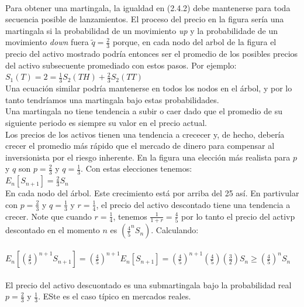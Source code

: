\documentclass{article}
\begin{document}
        \\
        Para obtener una martingala, la igualdad en (2.4.2) debe mantenerse para toda secuencia posible de lanzamientos.
        El proceso del precio en la figura sería una martingala si la probabilidad de un movimiento \textit{up} y la probabilidade
        de un movimiento \textit{down} fuera $\tilde{q} = \frac{2}{3}$ porque, en cada nodo del arbol de la figura el precio del
        activo mostrado podría entonces ser el promedio de los posibles precios
        del activo subsecuente promediado con estos pasos. Por ejemplo:
        \\
        $S_1(T) = 2 = \frac{1}{3} S_2(TH) + \frac{2}{3} S_2(TT)$
        \\
        Una ecuación similar podría mantenerse en todos los nodos en el árbol, y por lo tanto tendríamos una martingala bajo estas probabilidades.
        \\
        Una martingala no tiene tendencia a subir o caer dado que el promedio  de su
        siguiente periodo es siempre su valor en el precio actual.
        \\
        Los precios de los activos tienen una tendencia a crececer y, de hecho, debería crecer el promedio más rápido que
        el mercado de dinero para compensar al inversionista por el riesgo inherente. En la figura una elección más realista
        para $p$ y $q$ son $p = \frac{2}{3}$ y $q = \frac{1}{3}$.
        Con estas elecciones tenemos:
        \\
        $E_n[S_{n+1}] = \frac{2}{3} S_n$
        \\
        En cada nodo del árbol. Este crecimiento está por arriba del 25%
        así. En partivular con $p = \frac{2}{3}$ y $q=\frac{1}{3}$ y $r = \frac{1}{4}$, el precio del activo
        descontado tiene una tendencia a crecer. Note que cuando $r = \frac{1}{4}$, tenemos $\frac{1}{1+r} = \frac{4}{5}$ por lo tanto
        el precio del activp descontado en el momento $n$ es $(\frac{4}{5}^n S_n)$. Calculando:
        \\
        \\
        $E_n[(\frac{4}{5})^{n+1} S_{n+1}] = (\frac{4}{5})^{n+1}E_n[ S_{n+1}] = (\frac{4}{5})^{n+1} (\frac{4}{5}) (\frac{3}{2}) S_n \ge (\frac{4}{5})^n S_n$
        \\
        \\
        El precio del activo descuontado es una submartingala bajo la probabilidad real $p=\frac{2}{3}$ y $\frac{1}{3}$. ESte es el caso típico en mercados reales.
\end{document}
